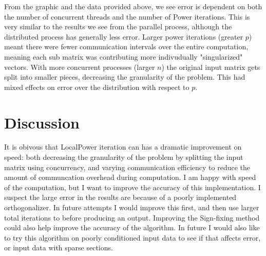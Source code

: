 \documentclass[hidelinks]{article}
\begin{document}
From the graphic and the data provided above, we see error is dependent on both the number of concurrent threads and the number of Power iterations. This is very similar to the results we see from the parallel process, although the distributed process has generally less error. Larger power iterations (greater $p$) meant there were fewer communication intervals over the entire computation, meaning each sub matrix was contributing more indivudually "singularized" vectors. With more concurrent processes (larger $n$) the original input matrix gets split into smaller pieces, decreasing the granularity of the problem. This had mixed effects on error over the distribution with respect to $p$.

\section {Discussion}
It is obivous that LocalPower iteration can has a dramatic improvement on speed: both decreasing the granularity of the problem by splitting the input matrix using concurrency, and varying communication efficiency to reduce the amount of communcation overhead during computation. I am happy with speed of the computation, but I want to improve the accuracy of this implementation. I suspect the large error in the results are because of a poorly implemented orthogonalizer. In future attempts I would improve this first, and then use larger total iterations to before producing an output. Improving the Sign-fixing method could also help improve the accuracy of the algorithm. In future I would also like to try this algorithm on poorly conditioned input data to see if that affects error, or input data with sparse sections.


\newpage

 

\end{document}
